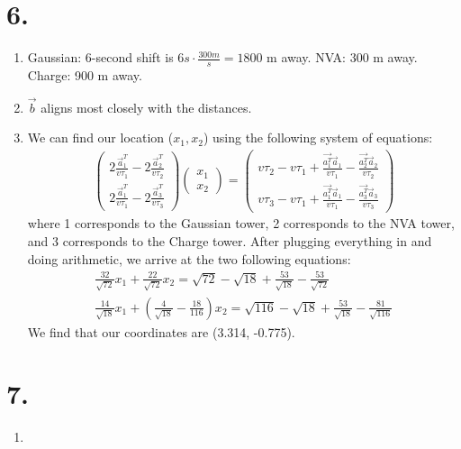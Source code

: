 \documentclass[11pt]{article}
\newenvironment{qparts}{\begin{enumerate}[{(}a{)}]}{\end{enumerate}}
\begin{document}
\section*{6.}
\begin{qparts}
\item
Gaussian: 6-second shift is $6s \cdot \frac{300 m}{s} = 1800$ m away. NVA: 300 m away. Charge: 900 m away.
\item
$\vec{b}$ aligns most closely with the distances.
\item
We can find our location ($x_1, x_2$) using the following system of equations:
\begin{align*}
    \begin{pmatrix}
        2 \frac{\vec{a}_1^T}{v\tau_1} - 2 \frac{\vec{a}_2^T}{v\tau_2} \\
        2 \frac{\vec{a}_1^T}{v\tau_1} - 2 \frac{\vec{a}_3^T}{v\tau_3}
    \end{pmatrix}
    \begin{pmatrix}
        x_1 \\
        x_2
    \end{pmatrix}
    = 
    \begin{pmatrix}
        v \tau_2 - v \tau_1 + \frac{\vec{{a}_1^T}\vec{a}_1}{v\tau_1} - \frac{\vec{{a}_2^T}\vec{a}_2}{v\tau_2} \\
        v \tau_3 - v \tau_1 + \frac{\vec{{a}_1^T}\vec{a}_1}{v\tau_1} - \frac{\vec{{a}_3^T}\vec{a}_3}{v\tau_3}
    \end{pmatrix}
\end{align*}
where 1 corresponds to the Gaussian tower, 2 corresponds to the NVA tower, and 3 corresponds to the Charge tower. 
After plugging everything in and doing arithmetic, we arrive at the two following equations:
\begin{align*}
    \frac{32}{\sqrt{72}}x_1 + \frac{22}{\sqrt{72}}x_2 = \sqrt{72} - \sqrt{18}+\frac{53}{\sqrt{18}}-\frac{53}{\sqrt{72}} \\
    \frac{14}{\sqrt{18}}x_1 + (\frac{4}{\sqrt{18}} - \frac{18}{116})x_2 = \sqrt{116} - \sqrt{18} + \frac{53}{\sqrt{18}} - \frac{81}{\sqrt{116}}
\end{align*}
We find that our coordinates are (3.314, -0.775).
\end{qparts}

\newpage
\section*{7.}
\begin{qparts}
\item

\end{qparts}
\end{document}
